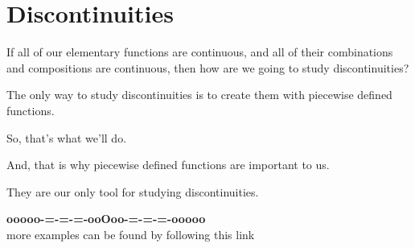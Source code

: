 \documentclass{ximera}
\begin{document}
\section*{Discontinuities}


If all of our elementary functions are continuous, and all of their combinations and compositions are continuous, then how are we going to study discontinuities? 


The only way to study discontinuities is to create them with piecewise defined functions. 

So, that's what we'll do. 


And, that is why piecewise defined functions are important to us.  

They are our only tool for studying discontinuities.






























\begin{center}
\textbf{\textcolor{green!50!black}{ooooo-=-=-=-ooOoo-=-=-=-ooooo}} \\

more examples can be found by following this link\\ 

\end{center}
\end{document}
